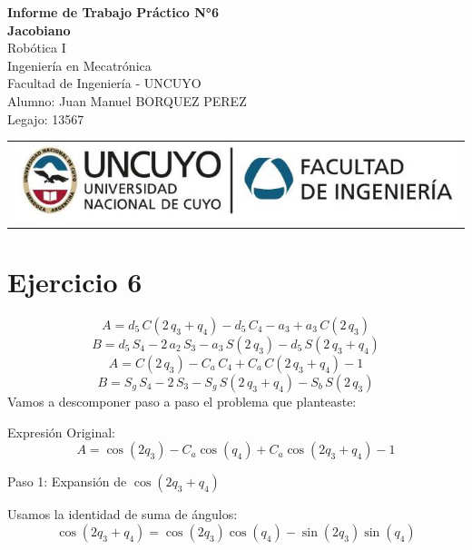 \documentclass[a4paper,12pt]{article}
\begin{document}
\begin{titlepage}
    \centering
    \vspace*{5cm}
    {\Huge\bfseries Informe de Trabajo Práctico N°6}\\
    \vspace{0.2cm}
    {\Large \textbf{Jacobiano}}\\
    \vspace{0.5cm}
    {\Large Robótica I}\\
    \vspace{0.5 cm}
    {\Large Ingeniería en Mecatrónica}\\
    \vspace{0.2 cm}
    {\Large Facultad de Ingeniería - UNCUYO}\\
    \vspace{1.5cm}
    Alumno: Juan Manuel BORQUEZ PEREZ\\
    Legajo: 13567\\
    \vfill
    {\begin{tabular}{@{}c@{}}\includegraphics[scale=0.4]{escudo.PNG}\end{tabular}}\hspace{10pt}
\end{titlepage}

\section{Ejercicio 6}


\[
    A = d_{5}\,C\left(2\,q_{3}+q_{4}\right)-d_{5}\,C_4-a_{3}+a_{3}\,C\left(2\,q_{3}\right)
\]
\[
    B = d_{5}\,S_4-2\,a_{2}\,S_3-a_{3}\,S\left(2\,q_{3}\right)-d_{5}\,S\left(2\,q_{3}+q_{4}\right)
\]
\[ 
    A = C\left(2\,q_{3}\right)-C_{a}\,C_4+C_a\,C\left(2\,q_{3}+q_{4}\right)-1
\]
\[
    B = S_g\,S_4-2\,S_3-S_g\,S\left(2\,q_{3}+q_{4}\right)-S_b\,S\left(2\,q_{3}\right)
\]
Vamos a descomponer paso a paso el problema que planteaste:

Expresión Original:
\[
A = \cos(2q_3) - C_a \cos(q_4) + C_a \cos(2q_3 + q_4) - 1
\]

Paso 1: Expansión de \(\cos(2q_3 + q_4)\)

Usamos la identidad de suma de ángulos:
\[
\cos(2q_3 + q_4) = \cos(2q_3)\cos(q_4) - \sin(2q_3)\sin(q_4)
\]
\end{document}
